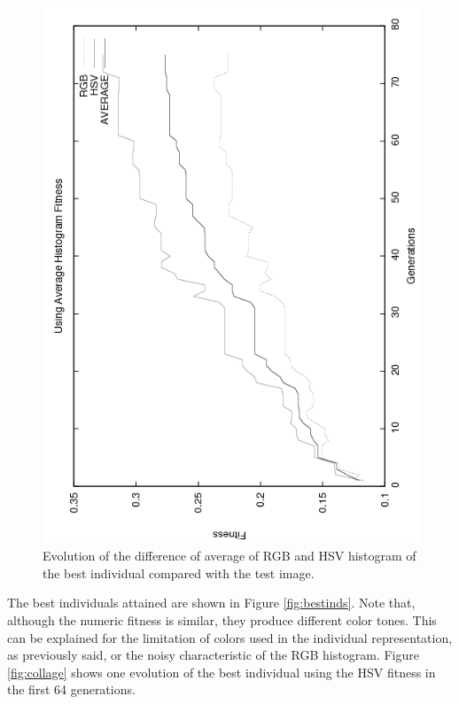 \begin{figure}
   \includegraphics[angle=-90,scale =0.40] {gfx/art/averagegens.png}
\caption{Evolution of the difference of average of RGB and HSV histogram of the best individual compared with the test image. }
\label{fig:averagegens}
\end{figure}

The best individuals attained are shown in Figure \ref{fig:bestinds}. Note that, although the numeric fitness is similar, they produce different color tones. This can be explained for the limitation of colors used in the individual representation, as previously said, or the noisy characteristic of the RGB histogram. Figure \ref{fig:collage} shows one evolution of the best individual using the HSV fitness in the first 64 generations.

